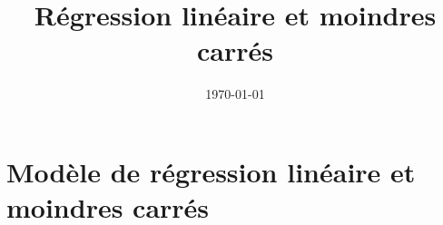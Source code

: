 

\title{Régression linéaire et moindres carrés}
\date{\today}



 

\maketitle


\section{Modèle de régression linéaire et moindres carrés}

